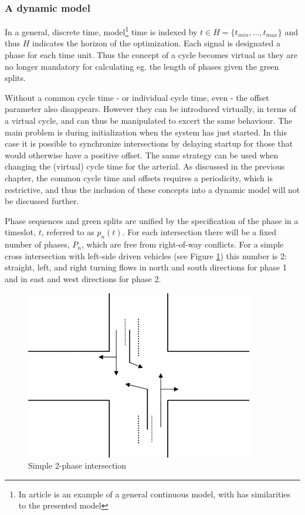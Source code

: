 \subsubsection*{A dynamic model}
\label{dynamicmodel}
In a general, discrete time, model\footnote{In article \cite{36} is an example of a general continuous model, with has similarities to the presented model} time is indexed by $t \in H = \lbrace t_{min},...,t_{max} \rbrace$ and thus $H$ indicates the horizon of the optimization. Each signal is designated a phase for each time unit. Thus the concept of a cycle becomes virtual as they are no longer mandatory for calculating eg. the length of phases given the green splits.

Without a common cycle time - or individual cycle time, even - the offset parameter also disappears. However they can be introduced virtually, in terms of a virtual cycle, and can thus be manipulated to excert the same behaviour. 
The main problem is during initialization when the system has just started. In this case it is possible to synchronize intersections by delaying startup for those that would otherwise have a positive offset. The same strategy can be used when changing the (virtual) cycle time for the arterial. As discussed in the previous chapter, the common cycle time and offsets requires a periodicity, which is restrictive, and thus the inclusion of these concepts into a dynamic model will not be discussed further.

Phase sequences and green splits are unified by the specification of the phase in a timeslot, $t$, referred to as $p_n(t)$. For each intersection there will be a fixed number of phases, $P_n$, which are free from right-of-way conflicts. For a simple cross intersection with left-side driven vehicles (see Figure \ref{fig:simple_intersection}) this number is 2: straight, left, and right turning flows in north and south directions for phase 1 and in east and west directions for phase 2.

\begin{figure}[!ht]
\begin{center}
\includegraphics[scale=0.4]{simple_intersection.png} 
\end{center}
\caption{Simple 2-phase intersection}
\label{fig:simple_intersection}
\end{figure}

